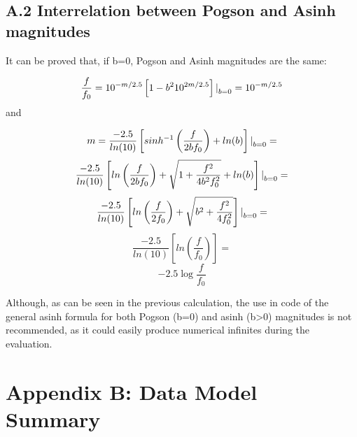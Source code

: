 \documentclass[11pt,a4paper]{ivoa}
\begin{document}
\subsection{A.2 Interrelation between Pogson and Asinh magnitudes}
It can be proved that, if b=0, Pogson and Asinh magnitudes are the same:\par
\[
\frac{f}{f_0}=10^{-m/2.5}\left[ 1-b^2 10^{2m/2.5}\right] \text{\textbar}_{b=0} =10^{-m/2.5}
\]
and\par
\[
m=\frac{-2.5}{ln(10)}\left[ sinh^{-1} \left(\frac{f}{2bf_0}\right) + ln(b)\right] \text{\textbar}_{b=0} =
\]
\[
\frac{-2.5}{ln(10)}\left[ ln\left(\frac{f}{2bf_0}\right) + \sqrt{1+\frac{f^2}{4b^2 f_0^2}} + ln(b)\right] \text{\textbar}_{b=0} =
\]
\[
\frac{-2.5}{ln(10)}\left[ ln\left(\frac{f}{2f_0}\right) + \sqrt{b^2+\frac{f^2}{4 f_0^2}}\right] \text{\textbar}_{b=0} =
\]
\[
\frac{-2.5}{ln(10)}\left[ ln(\frac{f}{f_0}) \right] =
\]
\[
-2.5\log{\frac{f}{f_0}}
\]


Although, as can be seen in the previous calculation, the use in code of the general asinh formula for both Pogson (b=0) and asinh (b>0) magnitudes is not recommended, as it could easily produce numerical infinites during the evaluation. 
\par


\section{Appendix B: Data Model Summary}


\end{document}
